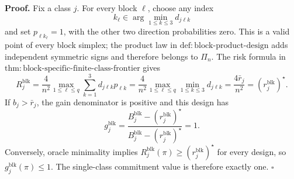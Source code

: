 \textbf{Proof.}
Fix a class \(j\). For every block \(\ell\), choose any index
\[
k_\ell\in\arg\min_{1\le k\le3}d_{j\ell k}
\]
and set \(p_{\ell k_\ell}=1\), with the other two direction probabilities zero.  This is a valid point of every block simplex; the product law in \(\mathrm{def:block\text{-}product\text{-}design}\) adds independent symmetric signs and therefore belongs to \(\Pi_n\).  The risk formula in \(\mathrm{thm:block\text{-}specific\text{-}finite\text{-}class\text{-}frontier}\) gives
\[
R_j^{\mathrm{blk}}
=\frac4{n^2}\max_{1\le\ell\le q}
\sum_{k=1}^3d_{j\ell k}p_{\ell k}
=\frac4{n^2}\max_{1\le\ell\le q}
\min_{1\le k\le3}d_{j\ell k}
=\frac{4\bar r_j}{n^2}
=(r_j^{\mathrm{blk}})^\star.
\]
If \(b_j>\bar r_j\), the gain denominator is positive and this design has
\[
g_j^{\mathrm{blk}}
=\frac{B_j^{\mathrm{blk}}-(r_j^{\mathrm{blk}})^\star}
{B_j^{\mathrm{blk}}-(r_j^{\mathrm{blk}})^\star}=1.
\]
Conversely, oracle minimality implies \(R_j^{\mathrm{blk}}(\pi)\ge(r_j^{\mathrm{blk}})^\star\) for every design, so \(g_j^{\mathrm{blk}}(\pi)\le1\). The single-class commitment value is therefore exactly one. \(\square\)